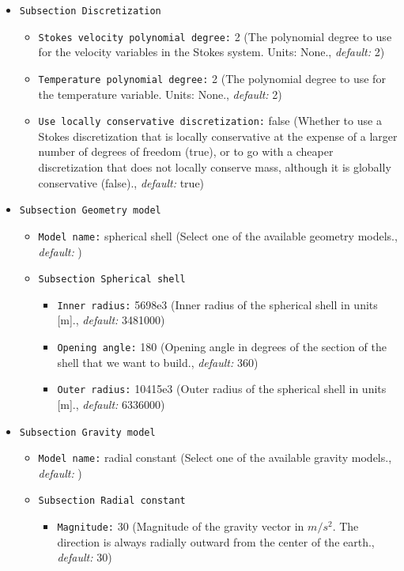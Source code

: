 \begin{itemize}
\item {\tt Subsection Discretization}
\begin{itemize}
\item {\tt Stokes velocity polynomial degree:} 2 (The polynomial degree to use for the velocity variables in the Stokes system. Units: None., {\it default:} 2)
\item {\tt Temperature polynomial degree:} 2 (The polynomial degree to use for the temperature variable. Units: None., {\it default:} 2)
\item {\tt Use locally conservative discretization:} false (Whether to use a Stokes discretization that is locally conservative at the expense of a larger number of degrees of freedom (true), or to go with a cheaper discretization that does not locally conserve mass, although it is globally conservative (false)., {\it default:} true)
\end{itemize}

\item {\tt Subsection Geometry model}
\begin{itemize}
\item {\tt Model name:} spherical shell (Select one of the available geometry models., {\it default:} )



\item {\tt Subsection Spherical shell}
\begin{itemize}
\item {\tt Inner radius:} 5698e3 (Inner radius of the spherical shell in units [m]., {\it default:} 3481000)
\item {\tt Opening angle:} 180 (Opening angle in degrees of the section of the shell that we want to build., {\it default:} 360)
\item {\tt Outer radius:} 10415e3 (Outer radius of the spherical shell in units [m]., {\it default:} 6336000)
\end{itemize}
\end{itemize}

\item {\tt Subsection Gravity model}
\begin{itemize}
\item {\tt Model name:} radial constant (Select one of the available gravity models., {\it default:} )



\item {\tt Subsection Radial constant}
\begin{itemize}
\item {\tt Magnitude:} 30 (Magnitude of the gravity vector in $m/s^2$. The direction is always radially outward from the center of the earth., {\it default:} 30)
\end{itemize}
\end{itemize}


\end{itemize}
